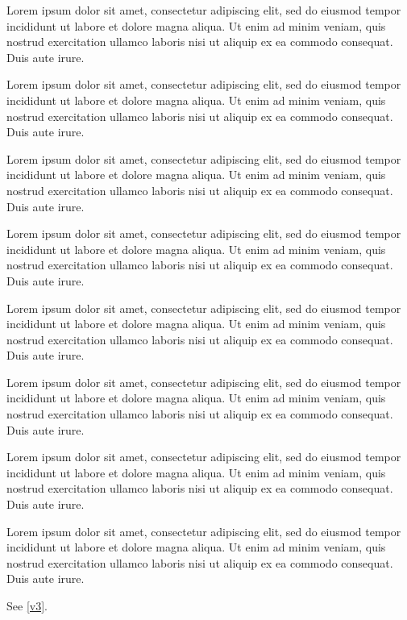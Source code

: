 \documentclass{article}
\begin{document}
\label{v9}Lorem ipsum dolor sit amet, consectetur adipiscing elit, sed do eiusmod tempor incididunt ut labore et dolore magna aliqua. Ut enim ad minim veniam, quis nostrud exercitation ullamco laboris nisi ut aliquip ex ea commodo consequat.\label{p9} Duis aute irure.

\label{v10}Lorem ipsum dolor sit amet, consectetur adipiscing elit, sed do eiusmod tempor incididunt ut labore et dolore magna aliqua. Ut enim ad minim veniam, quis nostrud exercitation ullamco laboris nisi ut aliquip ex ea commodo consequat.\label{p10} Duis aute irure.

\label{v11}Lorem ipsum dolor sit amet, consectetur adipiscing elit, sed do eiusmod tempor incididunt ut labore et dolore magna aliqua. Ut enim ad minim veniam, quis nostrud exercitation ullamco laboris nisi ut aliquip ex ea commodo consequat.\label{p11} Duis aute irure.

\label{v12}Lorem ipsum dolor sit amet, consectetur adipiscing elit, sed do eiusmod tempor incididunt ut labore et dolore magna aliqua. Ut enim ad minim veniam, quis nostrud exercitation ullamco laboris nisi ut aliquip ex ea commodo consequat.\label{p12} Duis aute irure.

\label{v13}Lorem ipsum dolor sit amet, consectetur adipiscing elit, sed do eiusmod tempor incididunt ut labore et dolore magna aliqua. Ut enim ad minim veniam, quis nostrud exercitation ullamco laboris nisi ut aliquip ex ea commodo consequat.\label{p13} Duis aute irure.

\label{v14}Lorem ipsum dolor sit amet, consectetur adipiscing elit, sed do eiusmod tempor incididunt ut labore et dolore magna aliqua. Ut enim ad minim veniam, quis nostrud exercitation ullamco laboris nisi ut aliquip ex ea commodo consequat.\label{p14} Duis aute irure.

\label{v15}Lorem ipsum dolor sit amet, consectetur adipiscing elit, sed do eiusmod tempor incididunt ut labore et dolore magna aliqua. Ut enim ad minim veniam, quis nostrud exercitation ullamco laboris nisi ut aliquip ex ea commodo consequat.\label{p15} Duis aute irure.

\label{v16}Lorem ipsum dolor sit amet, consectetur adipiscing elit, sed do eiusmod tempor incididunt ut labore et dolore magna aliqua. Ut enim ad minim veniam, quis nostrud exercitation ullamco laboris nisi ut aliquip ex ea commodo consequat.\label{p16} Duis aute irure.

See \cref{v3}.
\end{document}
